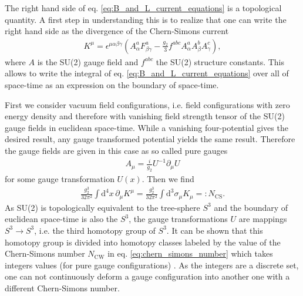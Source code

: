 \documentclass[13pt,a4paper,titlepage]{article}
\begin{document}
The right hand side of eq. \eqref{eq:B_and_L_current_equations} is a topological quantity.
A first step in understanding this is to realize that one can write the right hand side as the divergence of the Chern-Simons current \cite[eq. 4.2, 4.3]{Cline:2006ts_Baryogenesis}
\begin{align}
    \label{eq:chern_simons_current}
    K^\mu = \epsilon^{\mu \alpha \beta \gamma} \left( A^a_\alpha F^a_{\beta \gamma} - \frac{g_2}{3} f^{abc} A^a_\alpha A^b_\beta A^c_\gamma \right),
\end{align}
where $A$ is the SU(2) gauge field and $f^{abc}$ the SU(2) structure constants.
This allows to write the integral of eq. \eqref{eq:B_and_L_current_equations}
over all of space-time as an expression on the boundary of space-time.

\noindent
First we consider vacuum field configurations, i.e. field configurations with zero energy density and therefore with vanishing field strength tensor of the SU(2) gauge fields in euclidean space-time. While a vanishing four-potential gives the desired result, any gauge transformed potential yields the same result.
Therefore the gauge fields are given in this case as so called pure gauges \cite[sec. 2.1]{Di_Luzio_2020_Landscape_of_QCD_Axion_models}
\begin{align}
    A_\mu = \frac{i}{g_2} U^{-1} \partial_\mu U
\end{align}
for some gauge transformation $U(x)$.
Then we find
\begin{align}
    \label{eq:chern_simons_number}
    \frac{g_2^3}{32 \pi^2} \int \mathrm{d}^4 x \, \partial_\mu K^\mu =
    \frac{g_2^3}{32 \pi^2} \int \mathrm{d}^3 \sigma_\mu K_\mu
     =: N_{\mathrm{CS}}.
\end{align}
As SU(2) is topologically equivalent to the tree-sphere $S^3$ and the boundary of euclidean space-time is also the $S^3$, the gauge transformations $U$ are
mappings $S^3 \to S^3$, i.e. the third homotopy group of $S^3$.
It can be shown that this homotopy group is divided into homotopy classes labeled by the value of the Chern-Simons number $N_\mathrm{CW}$ in eq. \eqref{eq:chern_simons_number} which takes integers values (for pure gauge configurations) \cite{homotopy_spheres}.
As the integers are a discrete set, one can not continuously deform a gauge configuration into another one with a different Chern-Simons number.
\end{document}

